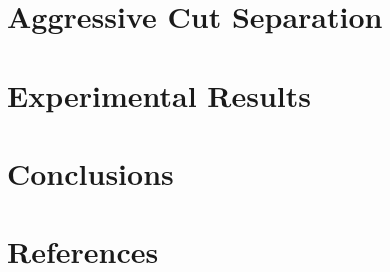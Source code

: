 \documentclass[preprint,12pt]{elsarticle}
\begin{document}
\section{Aggressive Cut Separation}

\section{Experimental Results}

\section{Conclusions}



\section*{References}
   
  





\end{document}
